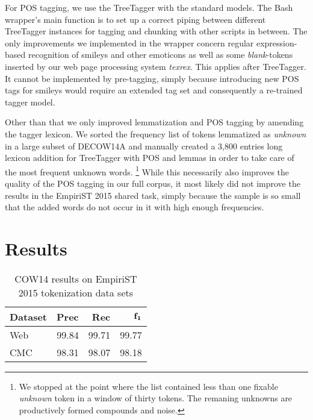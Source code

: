 \documentclass[11pt]{article}
\begin{document}
For POS tagging, we use the TreeTagger \cite{Schmid1994b} with the standard models.
The Bash wrapper's main function is to set up a correct piping between different TreeTagger instances for tagging and chunking with other scripts in between.
The only improvements we implemented in the wrapper concern regular expression-based recognition of smileys and other emoticons as well as some \textit{blank}-tokens inserted by our web page processing system \textit{texrex}.
This applies after TreeTagger.
It cannot be implemented by pre-tagging, simply because introducing new POS tags for smileys would require an extended tag set and consequently a re-trained tagger model.

Other than that we only improved lemmatization and POS tagging by amending the tagger lexicon.
We sorted the frequency list of tokens lemmatized as \textit{unknown} in a large subset of DECOW14A and manually created a 3,800 entries long lexicon addition for TreeTagger with POS and lemmas in order to take care of the most frequent unknown words.%
\footnote{We stopped at the point where the list contained less than one fixable \textit{unknown} token in a window of thirty tokens.
The remaning unknowns are productively formed compounds and noise.}
While this necessarily also improves the quality of the POS tagging in our full corpus, it most likely did not improve the results in the EmpiriST 2015 shared task, simply because the sample is so small that the added words do not occur in it with high enough frequencies.

\section{Results}
\label{sec:results}

\begin{table}[!htb]
  \centering
  \begin{tabular}{|l|rrr|}
    \hline
    \textbf{Dataset} & \textbf{Prec} & \textbf{Rec} & $\mathrm{\bf f_1}$ \\
    \hline
    Web & 99.84 & 99.71 & 99.77 \\
    CMC & 98.31 & 98.07 & 98.18 \\
    \hline
  \end{tabular}
  \caption{COW14 results on EmpiriST 2015 tokenization data sets}
  \label{tab:resultstok}
\end{table}
\end{document}

